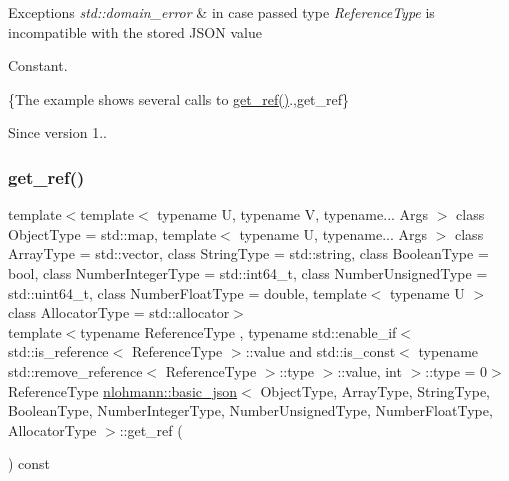 \begin{DoxyExceptions}{Exceptions}
{\em std\+::domain\+\_\+error} & in case passed type {\itshape Reference\+Type} is incompatible with the stored J\+S\+ON value\\
\hline
\end{DoxyExceptions}
Constant.

\{The example shows several calls to {\ttfamily \hyperlink{classnlohmann_1_1basic__json_a4f332e90f3cae562d0c3fa6ba48f74f9}{get\+\_\+ref()}}.,get\+\_\+ref\}

\begin{DoxySince}{Since}
version 1.. 
\end{DoxySince}
\hypertarget{classnlohmann_1_1basic__json_ab5386a09a24b341435172f43962a43f2}{}\label{classnlohmann_1_1basic__json_ab5386a09a24b341435172f43962a43f2} 
\subsubsection{\texorpdfstring{get\+\_\+ref()}{get\_ref()}\hspace{0.1cm}{\footnotesize\ttfamily [2/2]}}
{\footnotesize\ttfamily template$<$template$<$ typename U, typename V, typename... Args $>$ class Object\+Type = std\+::map, template$<$ typename U, typename... Args $>$ class Array\+Type = std\+::vector, class String\+Type  = std\+::string, class Boolean\+Type  = bool, class Number\+Integer\+Type  = std\+::int64\+\_\+t, class Number\+Unsigned\+Type  = std\+::uint64\+\_\+t, class Number\+Float\+Type  = double, template$<$ typename U $>$ class Allocator\+Type = std\+::allocator$>$ \\
template$<$typename Reference\+Type , typename std\+::enable\+\_\+if$<$ std\+::is\+\_\+reference$<$ Reference\+Type $>$\+::value and std\+::is\+\_\+const$<$ typename std\+::remove\+\_\+reference$<$ Reference\+Type $>$\+::type $>$\+::value, int $>$\+::type  = 0$>$ \\
Reference\+Type \hyperlink{classnlohmann_1_1basic__json}{nlohmann\+::basic\+\_\+json}$<$ Object\+Type, Array\+Type, String\+Type, Boolean\+Type, Number\+Integer\+Type, Number\+Unsigned\+Type, Number\+Float\+Type, Allocator\+Type $>$\+::get\+\_\+ref (\begin{DoxyParamCaption}{ }\end{DoxyParamCaption}) const\hspace{0.3cm}{\ttfamily [inline]}}



